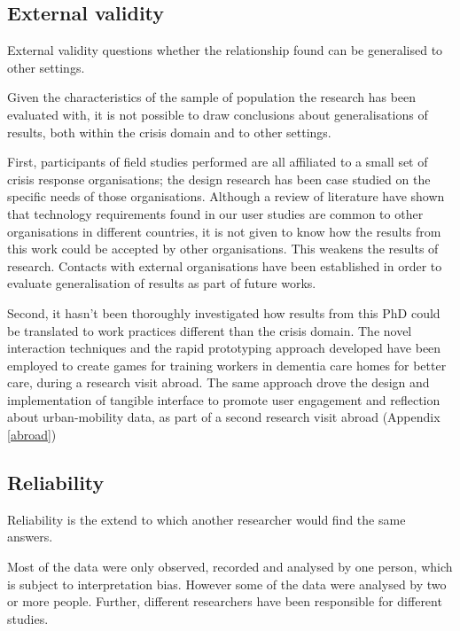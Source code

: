 \subsection{External validity}\label{external-validity}

External validity questions whether the relationship found can be generalised to other settings.

Given the characteristics of the sample of population the research has been evaluated with, it is not possible to draw conclusions about generalisations of results, both within the crisis domain and to other settings.

First, participants of field studies performed are all affiliated to a small set of crisis response organisations; the design research has been case studied on the specific needs of those organisations. Although a review of literature have shown that technology requirements found in our user studies are common to other organisations in different countries, it is not given to know how the results from this work could be accepted by other organisations. This weakens the results of research. Contacts with external organisations have been established in order to evaluate generalisation of results as part of future works.

Second, it hasn't been thoroughly investigated how results from this PhD could be translated to work practices different than the crisis domain. The novel interaction techniques and the rapid prototyping approach developed have been employed to create games for training workers in dementia care homes for better care, during a research visit abroad. The same approach drove the design and implementation of tangible interface to promote user engagement and reflection about urban-mobility data, as part of a second research visit abroad (Appendix \ref{abroad})

\subsection{Reliability}\label{reliability}

Reliability is the extend to which another researcher would find the same answers.

Most of the data were only observed, recorded and analysed by one person, which is subject to interpretation bias. However some of the data were analysed by two or more people. Further, different researchers have been responsible for different studies. 
